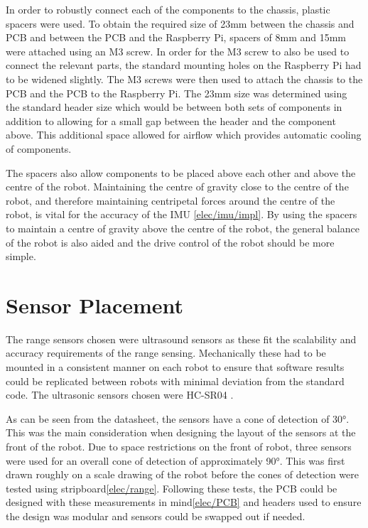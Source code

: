 In order to robustly connect each of the components to the chassis, plastic spacers were used. To obtain the required size of 
23mm  between the chassis and PCB and between the PCB and the Raspberry Pi, spacers of 8mm and 15mm were 
attached using an M3 screw. In order for the M3 screw to also be used to connect the relevant parts, the standard mounting holes 
on the Raspberry Pi had to be widened slightly. The M3 screws were then used to attach the chassis to the PCB and the PCB to the 
Raspberry Pi. The 23mm size was determined using the standard header size which would be between both sets of components in 
addition to allowing for a small gap between the header and the component above. This additional space allowed for airflow which 
provides automatic cooling of components. 

The spacers also allow components to be placed above each other and above the centre of the robot. Maintaining the centre of 
gravity close to the centre of the robot, and therefore maintaining centripetal forces around the centre of the robot, is vital 
for the accuracy of the IMU \ref{elec/imu/impl}. By using the spacers to maintain a centre of gravity above the centre of the 
robot, the general balance of the robot is also aided and the drive control of the robot should be more simple.    

\section{Sensor Placement}\label{mech/sensors}
The range sensors chosen were ultrasound sensors as these fit the scalability and accuracy requirements of the range sensing. 
Mechanically these had to be mounted in a consistent manner on each robot to ensure that software results could be replicated 
between robots with minimal deviation from the standard code. The ultrasonic sensors chosen were HC-SR04 .

As can be seen from the datasheet, the sensors have a cone of detection of \ang{30}. This was the main consideration when 
designing the layout of the sensors at the front of the robot. Due to space restrictions on the front of robot, three sensors 
were used for an overall cone of detection of approximately \ang{90}. This was first drawn roughly on a scale drawing of the 
robot before the cones of detection were tested using stripboard\ref{elec/range}. Following these tests, the PCB could be 
designed with these measurements in mind\ref{elec/PCB} and headers used to ensure the design was modular and sensors could be 
swapped out if needed. 

